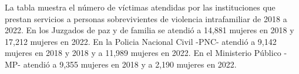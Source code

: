 \justifying La tabla muestra el número de víctimas atendidas por las instituciones que prestan servicios a personas sobrevivientes de violencia intrafamiliar de 2018 a 2022. En los Juzgados de paz y de familia se atendió a 14,881 mujeres en 2018 y 17,212 mujeres en 2022. En la Policia Nacional Civil -PNC- atendió a 9,142 mujeres en 2018 y  2018 y a 11,989 mujeres en 2022. En el Ministerio Público -MP- atendió a 9,355 mujeres en 2018 y a 2,190 mujeres en 2022.